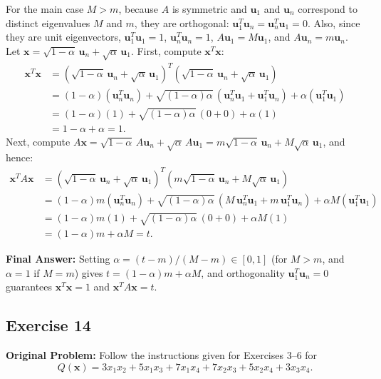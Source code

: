 \documentclass[11pt, letterpaper]{article}
\theoremstyle{definition}
\theoremstyle{remark}
\begin{document}
For the main case $M > m$, because $A$ is symmetric and $\mathbf{u}_1$ and $\mathbf{u}_n$ correspond to distinct eigenvalues $M$ and $m$, they are orthogonal: $\mathbf{u}_1^T \mathbf{u}_n = \mathbf{u}_n^T \mathbf{u}_1 = 0$. Also, since they are unit eigenvectors, $\mathbf{u}_1^T \mathbf{u}_1 = 1$, $\mathbf{u}_n^T \mathbf{u}_n = 1$, $A\mathbf{u}_1 = M\mathbf{u}_1$, and $A\mathbf{u}_n = m\mathbf{u}_n$. Let $\mathbf{x} = \sqrt{1 - \alpha}\,\mathbf{u}_n + \sqrt{\alpha}\,\mathbf{u}_1$. First, compute $\mathbf{x}^T \mathbf{x}$:
\begin{align*}
\mathbf{x}^T \mathbf{x} &= \left(\sqrt{1 - \alpha}\,\mathbf{u}_n + \sqrt{\alpha}\,\mathbf{u}_1\right)^T \left(\sqrt{1 - \alpha}\,\mathbf{u}_n + \sqrt{\alpha}\,\mathbf{u}_1\right) \\
&= (1 - \alpha)(\mathbf{u}_n^T \mathbf{u}_n) + \sqrt{(1 - \alpha)\alpha}\,(\mathbf{u}_n^T \mathbf{u}_1 + \mathbf{u}_1^T \mathbf{u}_n) + \alpha(\mathbf{u}_1^T \mathbf{u}_1) \\
&= (1 - \alpha)(1) + \sqrt{(1 - \alpha)\alpha}\,(0 + 0) + \alpha(1) \\
&= 1 - \alpha + \alpha = 1.
\end{align*}
Next, compute $A\mathbf{x} = \sqrt{1 - \alpha}\,A\mathbf{u}_n + \sqrt{\alpha}\,A\mathbf{u}_1 = m\sqrt{1 - \alpha}\,\mathbf{u}_n + M\sqrt{\alpha}\,\mathbf{u}_1$, and hence:
\begin{align*}
\mathbf{x}^T A \mathbf{x} &= \left(\sqrt{1 - \alpha}\,\mathbf{u}_n + \sqrt{\alpha}\,\mathbf{u}_1\right)^T \left(m\sqrt{1 - \alpha}\,\mathbf{u}_n + M\sqrt{\alpha}\,\mathbf{u}_1\right) \\
&= (1 - \alpha)m(\mathbf{u}_n^T \mathbf{u}_n) + \sqrt{(1 - \alpha)\alpha}\,(M\,\mathbf{u}_n^T \mathbf{u}_1 + m\,\mathbf{u}_1^T \mathbf{u}_n) + \alpha M(\mathbf{u}_1^T \mathbf{u}_1) \\
&= (1 - \alpha)m(1) + \sqrt{(1 - \alpha)\alpha}\,(0 + 0) + \alpha M(1) \\
&= (1 - \alpha)m + \alpha M = t.
\end{align*}

\textbf{Final Answer:} Setting $\alpha = (t - m)/(M - m) \in [0,1]$ (for $M > m$, and $\alpha=1$ if $M=m$) gives $t = (1-\alpha)m + \alpha M$, and orthogonality $\mathbf{u}_1^T \mathbf{u}_n = 0$ guarantees $\mathbf{x}^T \mathbf{x} = 1$ and $\mathbf{x}^T A \mathbf{x} = t$.

\subsection{Exercise 14}
\textbf{Original Problem:} Follow the instructions given for Exercises 3–6 for
\[
Q(\mathbf{x}) = 3x_1x_2 + 5x_1x_3 + 7x_1x_4 + 7x_2x_3 + 5x_2x_4 + 3x_3x_4.
\]
\end{document}
